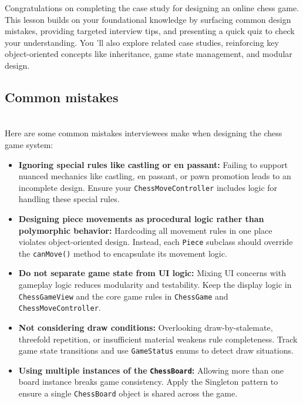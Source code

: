 

Congratulations on completing the case study for designing an online chess game. This lesson builds on your foundational knowledge by surfacing common design mistakes, providing targeted interview tips, and presenting a quick quiz to check your understanding. You 'll also explore related case studies, reinforcing key object-oriented concepts like inheritance, game state management, and modular design.

\subsection{Common mistakes}\label{kyBBEajrd4kXg7bfEUWV-}
\\
Here are some common mistakes interviewees make when designing the chess game system:

\begin{itemize}
\item
\protect{}\label{lmGJGUUERsrHtffvES7ml}
\textbf{Ignoring special rules like castling or en passant:} Failing to support nuanced mechanics like castling, en passant, or pawn promotion leads to an incomplete design. Ensure your \texttt{ChessMoveController} includes logic for handling these special rules.
\item
\protect{}\label{1p6vM4kh_bUuD9K1igxgb}
\textbf{Designing piece movements as procedural logic rather than polymorphic behavior:} Hardcoding all movement rules in one place violates object-oriented design. Instead, each \texttt{Piece} subclass should override the \texttt{canMove()} method to encapsulate its movement logic.
\item
\protect{}\label{baxyKH9JS6a90OZGuMJ6M}
\textbf{Do not separate game state from UI logic:} Mixing UI concerns with gameplay logic reduces modularity and testability. Keep the display logic in \texttt{ChessGameView} and the core game rules in \texttt{ChessGame} and \texttt{ChessMoveController}.
\item
\protect{}\label{ihq4rpJPVvaLuu0ZHF6qw}
\textbf{Not considering draw conditions:} Overlooking draw-by-stalemate, threefold repetition, or insufficient material weakens rule completeness. Track game state transitions and use \texttt{GameStatus} enums to detect draw situations.
\item
\protect{}\label{5CqJgGGeKtLYKdk_zOJ7t}
\textbf{Using multiple instances of the} \textbf{\texttt{ChessBoard}:} Allowing more than one board instance breaks game consistency. Apply the Singleton pattern to ensure a single \texttt{ChessBoard} object is shared across the game.
\end{itemize}

